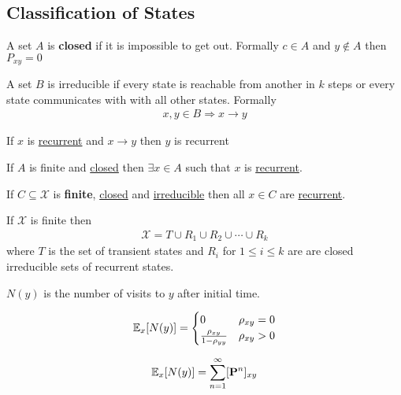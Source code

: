 \documentclass[12pt,a4paper]{article}
\begin{document}
\subsection{Classification of States}
\begin{defn}[Closed]
\label{closed}
A set $A$ is \textbf{closed} if  it is impossible to get out. Formally $c\in A$ and $y\notin A$ then $P_{xy} = 0$
\end{defn}
\begin{defn}[irreducible]
\label{irreducible}
A set $B$ is irreducible if every state is reachable from another in $k$ steps or every state communicates with with all other states. Formally 
\begin{align*}
x,y\in B \Rightarrow x \to y
\end{align*}
\end{defn}
\begin{lemma}
If $x$ is \hyperref[recurrent]{recurrent} and $x\to y$ then $y$ is recurrent
\end{lemma}
\begin{lemma}
\label{finiteclosed}
If $A$ is finite and \hyperref[closed]{closed} then $\exists x \in A$ such that $x$ is \hyperref[recurrent]{recurrent}. 
\end{lemma}
\begin{thm}
If $C\subseteq \mathcal{X}$ is \textbf{finite}, \hyperref[closed]{closed} and \hyperref[irreducible]{irreducible} then all $x\in C$ are \hyperref[recurrent]{recurrent}. 
\end{thm}
\begin{thm}
If $\mathcal{X}$ is finite then 
\begin{align*}
\mathcal{X} = T \cup R_1 \cup R_2 \cup \cdots \cup R_k
\end{align*}
where $T$ is the set of transient states and $R_i$ for $1\leq i \leq k$ are are
closed irreducible sets of recurrent states. 
\end{thm}
\begin{defn}
$N(y)$ is the number of visits to $y$ after initial time.  
\end{defn}
\begin{lemma}
\begin{align*}
\mathbb{E}_x[N(y)] = \begin{cases}
0 & \rho_{xy} = 0\\
\frac{\rho_{xy}}{1-\rho_{yy}} & \rho_{xy} > 0
\end{cases}
\end{align*}
\end{lemma}
\newpage
\begin{lemma}
\begin{align*}
\mathbb{E}_x[N(y)] = \sum\limits_{n=1}^{\infty} [\vb P^n]_{xy}
\end{align*}
\end{lemma}
\end{document}
